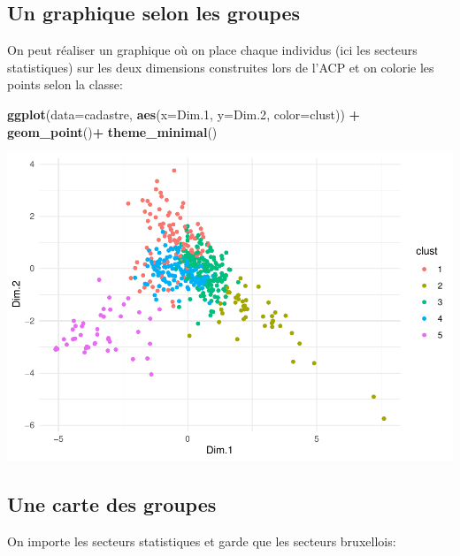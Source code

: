 \documentclass[
]{book}
\newenvironment{Shaded}{\begin{snugshade}}{\end{snugshade}}
\newcommand{\AttributeTok}[1]{\textcolor[rgb]{0.13,0.29,0.53}{#1}}
\newcommand{\FloatTok}[1]{\textcolor[rgb]{0.00,0.00,0.81}{#1}}
\newcommand{\FunctionTok}[1]{\textcolor[rgb]{0.13,0.29,0.53}{\textbf{#1}}}
\newcommand{\NormalTok}[1]{#1}
\newcommand{\SpecialCharTok}[1]{\textcolor[rgb]{0.81,0.36,0.00}{\textbf{#1}}}
\begin{document}
\hypertarget{un-graphique-selon-les-groupes}{%
\subsection{Un graphique selon les groupes}\label{un-graphique-selon-les-groupes}}

On peut réaliser un graphique où on place chaque individus (ici les secteurs statistiques) sur les deux dimensions construites lors de l'ACP et on colorie les points selon la classe:

\begin{Shaded}
\begin{Highlighting}[]
\FunctionTok{ggplot}\NormalTok{(}\AttributeTok{data=}\NormalTok{cadastre,}
       \FunctionTok{aes}\NormalTok{(}\AttributeTok{x=}\NormalTok{Dim}\FloatTok{.1}\NormalTok{, }\AttributeTok{y=}\NormalTok{Dim}\FloatTok{.2}\NormalTok{, }\AttributeTok{color=}\NormalTok{clust)) }\SpecialCharTok{+}
  \FunctionTok{geom\_point}\NormalTok{()}\SpecialCharTok{+}
  \FunctionTok{theme\_minimal}\NormalTok{()}
\end{Highlighting}
\end{Shaded}

\includegraphics{bookdown-demo_files/figure-latex/unnamed-chunk-101-1.pdf}

\hypertarget{une-carte-des-groupes}{%
\subsection{Une carte des groupes}\label{une-carte-des-groupes}}

On importe les secteurs statistiques et garde que les secteurs bruxellois:
\end{document}
